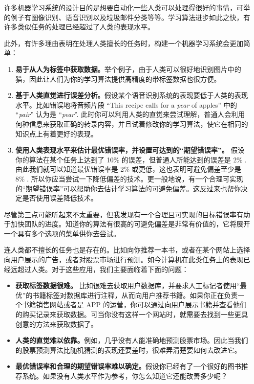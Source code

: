 许多机器学习系统的设计目的是想要自动化一些人类可以处理得很好的事情，可举的例子有图像识别、语音识别以及垃圾邮件分类等等。学习算法进步如此之快，有许多类似任务的处理已经超过了人类的表现水平。

此外，有许多理由表明在处理人类擅长的任务时，构建一个机器学习系统会更加简单：

\begin{enumerate}
\def\labelenumi{\arabic{enumi}.}
\tightlist
\item
  \textbf{易于从人为标签中获取数据。}举个例子，由于人类可以很好地识别图片中的猫，因此让人们为你的学习算法提供高精度的带标签数据也很方便。
\item
  \textbf{基于人类直觉进行误差分析。}假设某个语音识别系统的表现要低于人类的表现水平。比如错误地将音频片段
  ``This recipe calls for a \emph{pear} of apples'' 中的 ``\emph{pair}''
  认为是 ``\emph{pear}''.
  此时你可以利用人类的直觉来尝试理解，普通人会利用何种信息来获取正确的转录内容，并且试着修改你的学习算法，使它在相同的知识点上有着更好的表现。
\item
  \textbf{使用人类表现水平来估计最优错误率，并设置可达到的``期望错误率''。}
  假设你的算法在某个任务上达到了 10\% 的误差，但普通人所能达到的误差是
  2\% . 由此我们就可以知道最优错误率是 2\%
  或更低，这也表明可避免偏差至少是 8\% .
  所以你应当尝试一下降低偏差的技术。更一般地说，有一个合理可实现的``期望错误率''可以帮助你去估计学习算法的可避免偏差。这反过来也帮你决定是否使用误差降低技术。
\end{enumerate}

尽管第三点可能听起来不太重要，但我发现有一个合理且可实现的目标错误率有助于加快团队的进度。知道你的算法有很高的可避免偏差是非常有价值的，它将展开一个具有多个选项的菜单供你去尝试。

连人类都不擅长的任务也是存在的。比如向你推荐一本书，或者在某个网站上选择向用户展示的广告，或者对股票市场进行预测。如今计算机在此类任务上的表现已经远超过人类。对于这些应用，我们主要面临着下面的问题：

\begin{itemize}
\tightlist
\item
  \textbf{获取标签数据很难。}
  比如很难去获取用户数据库，并要求人工标记者使用``最优''的书籍标签对数据库进行注释，从而向用户推荐书籍。如果你正在负责一个书籍销售网站或者是
  APP
  的运营，你可以通过向用户展示书籍并查看他们的购买记录来获取数据。可当你没有这样一个网站时，就需要去找到一些更具创意的方法来获取数据了。
\item
  \textbf{人类的直觉难以依靠。}例如，几乎没有人能准确地预测股票市场。因此当我们的股票预测算法比随机猜测的表现还要差时，很难弄清楚要如何去改进它。
\item
  \textbf{最优错误率和合理的期望错误率难以确定。}假设你已经有了一个很好的图书推荐系统。如果没有人类水平作为参考，你怎么知道它还能改善多少呢？
\end{itemize}

